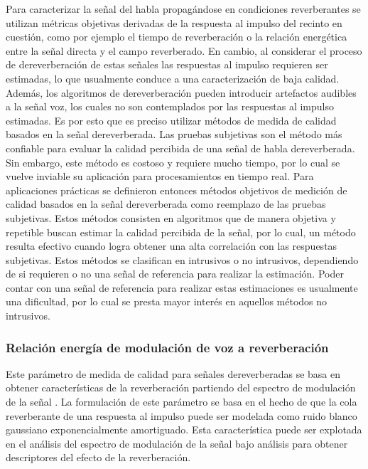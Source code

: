 Para caracterizar la señal del habla propagándose en condiciones reverberantes se utilizan métricas objetivas derivadas de la respuesta al impulso del recinto en cuestión, como por ejemplo el tiempo de reverberación o la relación energética entre la señal directa y el campo reverberado. En cambio, al considerar el proceso de dereverberación de estas señales las respuestas al impulso requieren ser estimadas, lo que usualmente conduce a una caracterización de baja calidad. Además, los algoritmos de dereverberación pueden introducir artefactos audibles a la señal voz, los cuales no son contemplados por las respuestas al impulso estimadas. Es por esto que es preciso utilizar métodos de medida de calidad basados en la señal dereverberada. Las pruebas subjetivas son el método más confiable para evaluar la calidad percibida de una señal de habla dereverberada. Sin embargo, este método es costoso y requiere mucho tiempo, por lo cual se vuelve inviable su aplicación para procesamientos en tiempo real. Para aplicaciones prácticas se definieron entonces métodos objetivos de medición de calidad basados en la señal dereverberada como reemplazo de las pruebas subjetivas. Estos métodos consisten en algoritmos que de manera objetiva y repetible buscan estimar la calidad percibida de la señal, por lo cual, un método resulta efectivo cuando logra obtener una alta correlación con las respuestas subjetivas. Estos métodos se clasifican en intrusivos o no intrusivos, dependiendo de si requieren o no una señal de referencia para realizar la estimación. Poder contar con una señal de referencia para realizar estas estimaciones es usualmente una dificultad, por lo cual se presta mayor interés en aquellos métodos no intrusivos. 

\subsubsection{Relación energía de modulación de voz a reverberación}

Este parámetro de medida de calidad para señales dereverberadas se basa en obtener características de la reverberación partiendo del espectro de modulación de la señal \cite{SRMR}. La formulación de este parámetro se basa en el hecho de que la cola reverberante de una respuesta al impulso puede ser modelada como ruido blanco gaussiano exponencialmente amortiguado. Esta característica puede ser explotada en el análisis del espectro de modulación de la señal bajo análisis para obtener descriptores del efecto de la reverberación.

